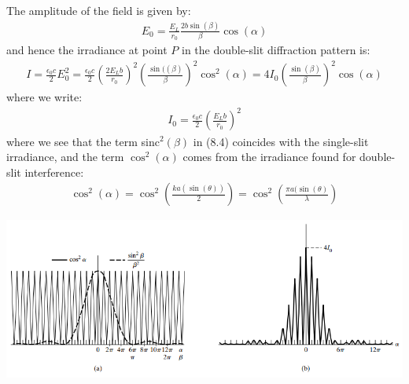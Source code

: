 \documentclass[11pt]{book}
\theoremstyle{break}
\theoremstyle{break}
\begin{document}
The amplitude of the field is given by:
\begin{align*}
E_0 = \frac{E_L}{r_0}\frac{2b\sin(\beta)}{\beta}\cos(\alpha)
\end{align*}
and hence the irradiance at point $P$ in the double-slit diffraction pattern is:
\begin{align}
I = \frac{\epsilon_0c}{2}E_0^2 = \frac{\epsilon_0 c}{2}\left( \frac{2E_L b}{r_0}\right)^2 \left( \frac{\sin((\beta)}{\beta}\right)^2 \cos^2(\alpha) = 4I_0 \left(\frac{\sin(\beta)}{\beta} \right)^2 \cos(\alpha)
\end{align}
where we write:
\begin{align*}
I_0 = \frac{\epsilon_0 c}{2}\left( \frac{E_L b}{r_0}\right)^2
\end{align*}
where we see that the term sinc$^2(\beta)$ in (8.4) coincides with the single-slit irradiance, and the term $\cos^2(\alpha)$ comes from the irradiance found for double-slit interference:
\begin{align*}
\cos^2(\alpha) = \cos^2\left(\frac{ka(\sin(\theta))}{2} \right) = \cos^2\left(\frac{\pi a(\sin(\theta)}{\lambda} \right)
\end{align*}
\begin{center}
\includegraphics[scale=0.88]{doubleSlitPatt}
\end{center}
\end{document}

